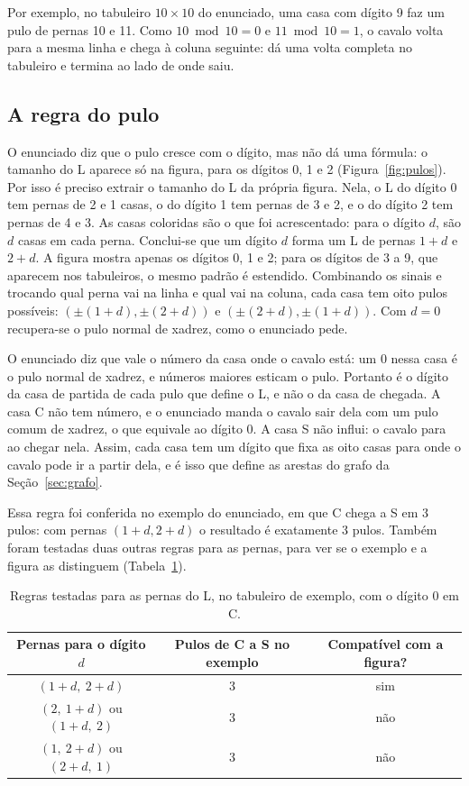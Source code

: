 Por exemplo, no tabuleiro $10 \times 10$ do enunciado, uma casa com dígito 9 faz um pulo de
pernas 10 e 11. Como $10 \bmod 10 = 0$ e $11 \bmod 10 = 1$, o cavalo volta para a mesma linha
e chega à coluna seguinte: dá uma volta completa no tabuleiro e termina ao lado de onde saiu.

\subsection{A regra do pulo}
\label{sec:regra}

O enunciado diz que o pulo cresce com o dígito, mas não dá uma fórmula: o tamanho do L aparece
só na figura, para os dígitos 0, 1 e 2 (Figura~\ref{fig:pulos}). Por isso é preciso extrair o
tamanho do L da própria figura. Nela, o L do
dígito 0 tem pernas de 2 e 1 casas, o do dígito 1 tem pernas de 3 e 2, e o do dígito 2 tem
pernas de 4 e 3. As casas coloridas são o que foi acrescentado: para o dígito $d$, são $d$ casas
em cada perna.
Conclui-se que um dígito $d$ forma um L de pernas $1 + d$ e $2 + d$. A figura mostra apenas os
dígitos 0, 1 e 2; para os dígitos de 3 a 9, que aparecem nos tabuleiros, o mesmo padrão é
estendido. Combinando os sinais e
trocando qual perna vai na linha e qual vai na coluna, cada casa tem oito pulos possíveis:
$(\pm(1 + d), \pm(2 + d))$ e $(\pm(2 + d), \pm(1 + d))$. Com $d = 0$ recupera-se o pulo
normal de xadrez, como o enunciado pede.

O enunciado diz que vale o número da casa onde o cavalo está: um 0 nessa casa é o pulo normal
de xadrez, e números maiores esticam o pulo. Portanto é o dígito da casa de partida de cada pulo
que define o L, e não o da casa de chegada. A casa C não tem número, e o enunciado manda o cavalo
sair dela com um pulo comum de xadrez, o que equivale ao dígito 0. A casa S não influi: o cavalo
para ao chegar nela. Assim, cada casa tem um dígito que fixa as oito casas para onde o cavalo
pode ir a partir dela, e é isso que define as arestas do grafo da Seção~\ref{sec:grafo}.

Essa regra foi conferida no exemplo do enunciado, em que C chega a S em 3 pulos: com pernas
$(1 + d, 2 + d)$ o resultado é exatamente 3 pulos. Também foram testadas duas outras regras para
as pernas, para ver se o exemplo e a figura as distinguem (Tabela~\ref{tab:hipoteses}).

\begin{table}[ht]
  \centering
  \caption{Regras testadas para as pernas do L, no tabuleiro de exemplo, com o dígito 0 em C.}
  \label{tab:hipoteses}
  \small
  \begin{tabular}{|c|c|c|}
    \hline
    \textbf{Pernas para o dígito $d$} & \textbf{Pulos de C a S no exemplo} & \textbf{Compatível com a figura?}\\
    \hline
    $(1 + d,\ 2 + d)$ & 3 & sim\\
    \hline
    $(2,\ 1 + d)$ ou $(1 + d,\ 2)$ & 3 & não\\
    \hline
    $(1,\ 2 + d)$ ou $(2 + d,\ 1)$ & 3 & não\\
    \hline
  \end{tabular}
\end{table}

